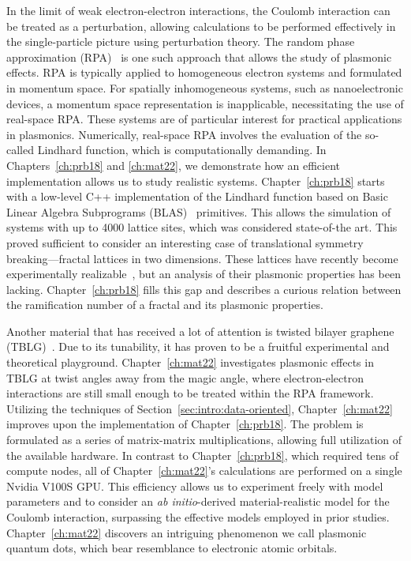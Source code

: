 In the limit of weak electron-electron interactions, the Coulomb interaction can be treated as a perturbation, allowing calculations to be performed effectively in the single-particle picture using perturbation theory. The random phase approximation (RPA)~\cite{Vonsov2012QuantumSolidS,giuliani2005quantum} is one such approach that allows the study of plasmonic effects. RPA is typically applied to homogeneous electron systems and formulated in momentum space. For spatially inhomogeneous systems, such as nanoelectronic devices, a momentum space representation is inapplicable, necessitating the use of real-space RPA. These systems are of particular interest for practical applications in plasmonics. Numerically, real-space RPA involves the evaluation of the so-called Lindhard function, which is computationally demanding. In Chapters~\ref{ch:prb18} and \ref{ch:mat22}, we demonstrate how an efficient implementation allows us to study realistic systems. Chapter~\ref{ch:prb18} starts with a low-level C++ implementation of the Lindhard function based on Basic Linear Algebra Subprograms (BLAS)~\cite{Lawson_1979_Basic_Linear_Al} primitives. This allows the simulation of systems with up to 4000 lattice sites, which was considered state-of-the art. This proved sufficient to consider an interesting case of translational symmetry breaking---fractal lattices in two dimensions. These lattices have recently become experimentally realizable~\cite{assembly2015}, but an analysis of their plasmonic properties has been lacking. Chapter~\ref{ch:prb18} fills this gap and describes a curious relation between the ramification number of a fractal and its plasmonic properties.

Another material that has received a lot of attention is twisted bilayer graphene (TBLG)~\cite{Andrei_2020_Graphene_bilaye}. Due to its tunability, it has proven to be a fruitful experimental and theoretical playground. Chapter~\ref{ch:mat22} investigates plasmonic effects in TBLG at twist angles away from the magic angle, where electron-electron interactions are still small enough to be treated within the RPA framework. Utilizing the techniques of Section~\ref{sec:intro:data-oriented}, Chapter~\ref{ch:mat22} improves upon the implementation of Chapter~\ref{ch:prb18}. The problem is formulated as a series of matrix-matrix multiplications, allowing full utilization of the available hardware. In contrast to Chapter~\ref{ch:prb18}, which required tens of compute nodes, all of Chapter~\ref{ch:mat22}'s calculations are performed on a single Nvidia V100S GPU. This efficiency allows us to experiment freely with model parameters and to consider an \textit{ab initio}-derived material-realistic model for the Coulomb interaction, surpassing the effective models employed in prior studies. Chapter~\ref{ch:mat22} discovers an intriguing phenomenon we call plasmonic quantum dots, which bear resemblance to electronic atomic orbitals.

